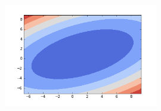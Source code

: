 \begin{figure}[h!]
\centering
\includegraphics[width=0.6\textwidth]{images/contourplot.png}
\end{figure}


